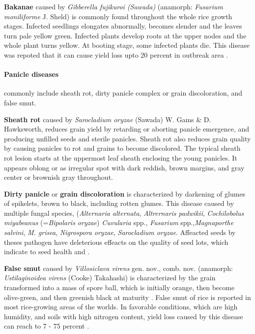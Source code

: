 \documentclass[12pt, oneside]{report}
\begin{document}
\textbf{Bakanae} caused by \textit{Gibberella fujikuroi (Sawada)} (anamorph: \textit{Fusarium moniliforme} J. Sheld) is commonly found throughout the whole rice growth stages. Infected seedlings elongates abnormally, becomes slender and the leaves turn pale yellow green. Infected plants develop roots at the upper nodes and the whole plant turns yellow. At booting stage, some infected plants die. This disease was repoted that it can cause yield loss upto 20 percent in outbreak area \cite{irrirkb}.


\paragraph{Panicle diseases} commonly include sheath rot, dirty panicle complex or grain discoloration, and false smut.

\textbf{Sheath rot} caused by \textit{Sarocladium oryzae} (Sawada) W. Gams \& D. Hawksworth, reduces grain yield by retarding or aborting panicle emergence, and producing unfilled seeds and sterile panicles. Sheath rot also reduces grain quality by causing panicles to rot and grains to become discolored. The typical sheath rot lesion starts at the uppermost leaf sheath enclosing the young panicles. It appears oblong or as irregular spot with dark reddish, brown margins, and gray center or brownish gray throughout.

\textbf{Dirty panicle} or \textbf{grain discoloration} is characterized by darkening of glumes of spikelets, brown to black, including rotten glumes. This disease caused by multiple fungal species, (\textit{Alternaria alternata}, \textit{Altrernaris padwikii}, \textit{Cochilobolus miyabeanus} (=\textit{Bipolaris oryzae}) \textit{Cuvularia} spp., \textit {Fusarium} spp.,\textit{Magnaporthe salvini}, \textit{M. grisea}, \textit{Nigrospora oryzae}, \textit{Sarocladium oryzae}. Affeacted seeds by theses pathogen have deleterious effeacts on the quality of seed lots, which indicate to seed health \citep{ouricedisease} and \citep{mew2002handbook}. 
 
\textbf{False smut} caused by \textit{Villosiclava virens} gen. nov., comb. nov. (anamorph: \textit{Ustilaginoidea virens} (Cooke) Takahashi) is characterized by the grain transformed into a mass of spore ball, which is initially orange, then become olive-green, and then greenish black at maturity \citep{tanaka2008villosiclava}. False smut of rice is reported in most rice-growing areas of the worlds. In favorable conditions, which are high humidity, and soils with high nitrogen content, yield loss caused by this disease can reach to 7 - 75 percent \citep{irrirkb}.
\end{document}
